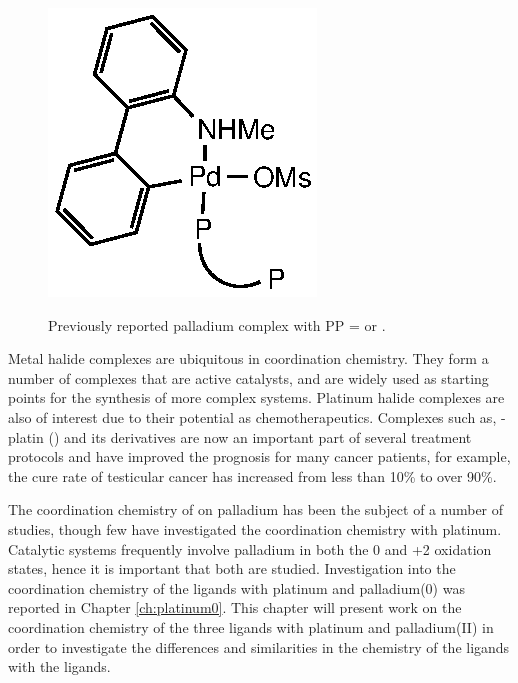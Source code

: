\begin{figure}[htbp]
\begin{center}
\vspace{0.5cm}
\includegraphics{../Figures/Pdmetallacycle.eps}
\caption[Previously reported palladium complex of \tBuxantphos{} and \Phxantphos{}]{Previously reported palladium complex with PP = \tBuxantphos{} or \Phxantphos{}.\cite{Friis2014}}
\vspace{0.2cm}
\label{Pdmetallacycle}
\end{center}
\end{figure}
\vspace{0.2cm}	

Metal halide complexes are ubiquitous in coordination chemistry.  They form a number of complexes that are active catalysts, and are widely used as starting points for the synthesis of more complex systems.  Platinum halide complexes are also of interest due to their potential as chemotherapeutics.  Complexes such as, \cis{}-platin (\ce{[PtCl2(NH3)2]}) and its derivatives are now an important part of  several treatment protocols and have improved the prognosis for many cancer patients, for example, the cure rate of testicular cancer has increased from less than 10\%{} to over 90\%.\cite{Wilson2013}

The coordination chemistry of \Phxantphos{} on palladium has been the subject of a number of studies, though few have investigated the coordination chemistry with platinum.\cite{Zuideveld2002, Raebiger2004, Bakhmutov2012, Miedaner2004, Klingensmith2006, Petocz2004, Yin2002}  Catalytic systems frequently involve palladium in both the 0 and +2 oxidation states, hence it is important that both are studied.\cite{Tsuji1995}  Investigation into the coordination chemistry of the \tBuxantphos{} ligands with platinum and palladium(0) was reported in Chapter \ref{ch:platinum0}.  This chapter will present work on the coordination chemistry of the three \tBuxantphos{} ligands with platinum and palladium(II) in order to investigate the differences and similarities in the chemistry of the \tBuxantphos{} ligands with the \Phxantphos{} ligands.  

